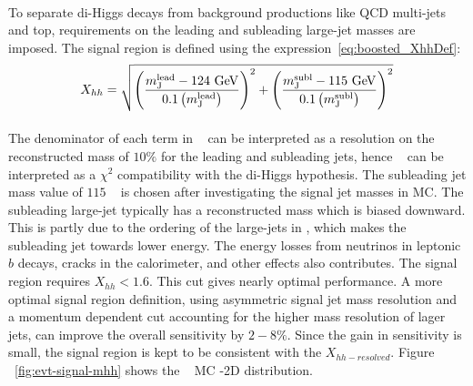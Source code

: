 \paragraph{}
To separate di-Higgs decays from background productions like QCD multi-jets and top, requirements on the leading and subleading large-\R jet masses are imposed.
The signal region is defined using the expression~\ref{eq:boosted_XhhDef}:
\begin{equation}
\label{eq:boosted_XhhDef}
X_{hh} = \sqrt{\left(\frac{m^{\rm lead}_{\rm J} - \text{124 GeV}}{0.1 \left(m^{\rm lead}_{\rm J}\right)}\right)^2 + \left(\frac{m^{\rm subl}_{\rm J}- \text{115 GeV}}{0.1 \left(m^{\rm subl}_{\rm J}\right)}\right)^2}
\end{equation}

\paragraph{}
The denominator of each term in \Xhh~ can be interpreted as a resolution on the reconstructed mass of $10\%$ for the leading and subleading jets, hence \Xhh~ can be interpreted as a $\chi^2$ compatibility with the di-Higgs hypothesis.
The subleading jet mass value of $115$ \GeV~ is chosen after investigating the signal jet masses in MC. 
The subleading large-\R jet typically has a reconstructed mass which is biased downward. 
This is partly due to the ordering of the large-\R jets in \pt, which makes the subleading jet towards lower energy. 
The energy losses from neutrinos in leptonic $b$ decays, cracks in the calorimeter, and other effects also contributes. 
The signal region requires $X_{hh} < 1.6$. 
This cut gives nearly optimal performance. 
A more optimal signal region definition, using asymmetric signal jet mass resolution and a momentum dependent cut accounting for the higher mass resolution of lager \pt~ jets, can improve the overall sensitivity by $2-8\%$.
Since the gain in sensitivity is small, the signal region is kept to be consistent with the $X_{hh-resolved}$. Figure ~\ref{fig:evt-signal-mhh} shows the \Grav~ MC \mlead-\msubl 2D distribution.



